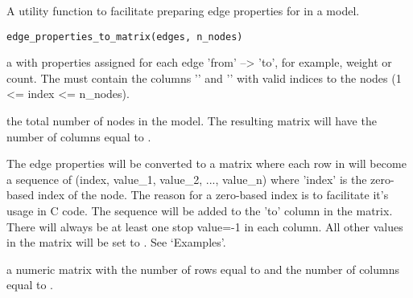 \documentclass[letterpaper]{book}
\begin{document}
%
\begin{Description}
A utility function to facilitate preparing edge properties for
 in a model.
\end{Description}
%
\begin{Usage}
\begin{verbatim}
edge_properties_to_matrix(edges, n_nodes)
\end{verbatim}
\end{Usage}
%
\begin{Arguments}
\begin{ldescription}
\item[\code{edges}] a  with properties assigned for each
edge 'from' --> 'to', for example, weight or count. The
 must contain the columns '' and
'' with valid indices to the nodes (1 <= index <=
n\_nodes).

\item[\code{n\_nodes}] the total number of nodes in the model. The
resulting matrix will have the number of columns equal to
.
\end{ldescription}
\end{Arguments}
%
\begin{Details}
The edge properties will be converted to a matrix where each row
in  will become a sequence of (index, value\_1,
value\_2, ..., value\_n) where 'index' is the zero-based index of
the  node. The reason for a zero-based index is to
facilitate it's usage in C code. The sequence will be added to the
'to' column in the matrix. There will always be at least one stop
value=-1 in each column. All other values in the matrix will be
set to . See `Examples'.
\end{Details}
%
\begin{Value}
a numeric matrix with the number of rows equal to
 and the
number of columns equal to .
\end{Value}
%
\end{document}
